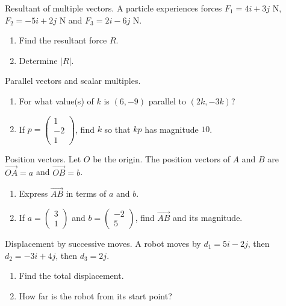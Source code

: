 \documentclass[11pt]{article}
\def\textbf#1{#1}%
\def\mathbf#1{#1}%
\newcounter{question}
\begin{document}
\begin{question}
\textbf{Resultant of multiple vectors.}
A particle experiences forces $\mathbf{F}_1=4\mathbf{i}+3\mathbf{j}$ N, $\mathbf{F}_2=-5\mathbf{i}+2\mathbf{j}$ N and $\mathbf{F}_3=2\mathbf{i}-6\mathbf{j}$ N.
\begin{enumerate}
  \item Find the resultant force $\mathbf{R}$.
  \item Determine $|\mathbf{R}|$.
\end{enumerate}
\end{question}

\begin{question}
\textbf{Parallel vectors and scalar multiples.}
\begin{enumerate}
  \item For what value(s) of $k$ is $(6,-9)$ parallel to $(2k,-3k)$?
  \item If $\mathbf{p}=\begin{pmatrix}1\\-2\\1\end{pmatrix}$, find $k$ so that $k\mathbf{p}$ has magnitude $10$.
\end{enumerate}
\end{question}

\begin{question}
\textbf{Position vectors.}
Let $O$ be the origin. The position vectors of $A$ and $B$ are $\overrightarrow{OA}=\mathbf{a}$ and $\overrightarrow{OB}=\mathbf{b}$.
\begin{enumerate}
  \item Express $\overrightarrow{AB}$ in terms of $\mathbf{a}$ and $\mathbf{b}$.
  \item If $\mathbf{a}=\begin{pmatrix}3\\1\end{pmatrix}$ and $\mathbf{b}=\begin{pmatrix}-2\\5\end{pmatrix}$, find $\overrightarrow{AB}$ and its magnitude.
\end{enumerate}
\end{question}

\begin{question}
\textbf{Displacement by successive moves.}
A robot moves by $\mathbf{d}_1=5\mathbf{i}-2\mathbf{j}$, then $\mathbf{d}_2=-3\mathbf{i}+4\mathbf{j}$, then $\mathbf{d}_3=2\mathbf{j}$.
\begin{enumerate}
  \item Find the total displacement.
  \item How far is the robot from its start point?
\end{enumerate}
\end{question}
\end{document}
